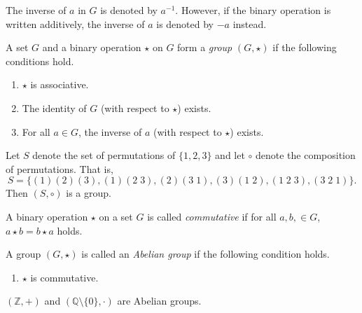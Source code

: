 \begin{notation}
  The inverse of $a$ in $G$ is denoted by $a^{-1}$.
  However, if the binary operation is written additively, the inverse of $a$
  is denoted by $-a$ instead.
\end{notation}

\begin{definition}\label{def:group}
  A set $G$ and a binary operation $\star$ on $G$ form a \emph{group}
  $(G, \star)$ if the following conditions hold.
  \begin{enumerate}[label=(G \arabic*),leftmargin=3.5em]
    \item $\star$ is associative.
    \item The identity of $G$ (with respect to $\star$) exists.
    \item For all $a \in G$, the inverse of $a$ (with respect to $\star$)
      exists.
  \end{enumerate}
\end{definition}

\begin{example}
  Let $S$ denote the set of permutations of $\{1, 2, 3\}$ and let $\circ$
  denote the composition of permutations. That is,
  \begin{equation*}
    S = \big\{
      (1)(2)(3), (1)(2\;3), (2)(3\;1), (3)(1\;2), (1\;2\;3), (3\;2\;1) 
    \big\}.
  \end{equation*}
  Then $(S, \circ)$ is a group.
\end{example}

\begin{definition}\label{def:commutativity}
  A binary operation $\star$ on a set $G$ is called \emph{commutative} if
  for all $a, b, \in G$, $a \star b = b \star a$ holds.
\end{definition}

\begin{definition}\label{def:abelian-group}
  A group $(G, \star)$ is called an \emph{Abelian group} if the following
  condition holds.
  \begin{enumerate}[label=(G \arabic*),leftmargin=3.5em,start=4]
    \item $\star$ is commutative.
  \end{enumerate}
\end{definition}

\begin{example}
  $(\mathbb{Z}, +)$ and $(\mathbb{Q} \setminus \{0\}, \cdot)$ are Abelian
  groups.
\end{example}

